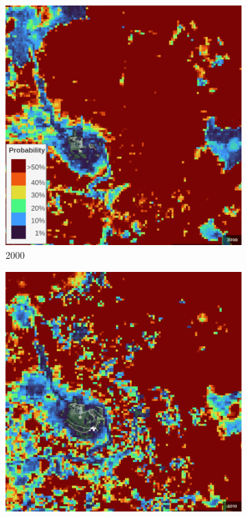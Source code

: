         \begin{figure}[H]
        \centering
        \begin{subfigure}[t]{0.24\textwidth}
        \centering
        \includegraphics[width=\linewidth,height=\linewidth]{figs_06/brocken_2000.png}
        \caption{2000}
        \end{subfigure}
        \hfill
        \begin{subfigure}[t]{0.24\textwidth}
        \centering
        \includegraphics[width=\linewidth,height=\linewidth]{figs_06/brocken_2010.png}

\end{subfigure}
\end{figure}
